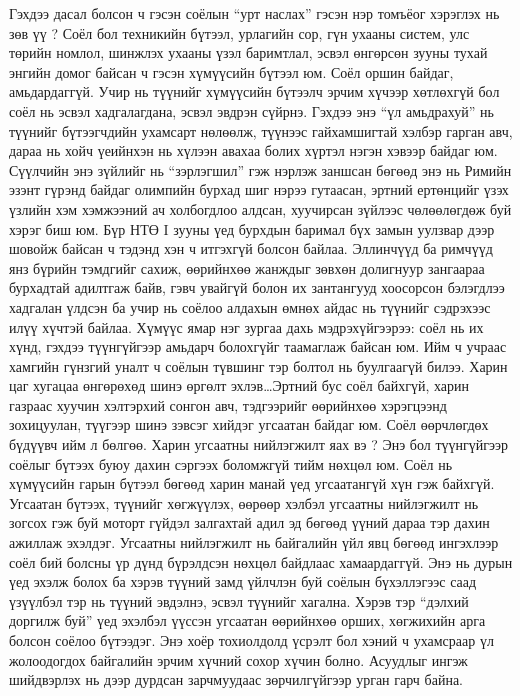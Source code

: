 Гэхдээ дасал болсон ч гэсэн соёлын “урт наслах” гэсэн нэр томъёог хэрэглэх нь зөв үү ? Соёл бол техникийн бүтээл, урлагийн сор, гүн ухааны систем, улс төрийн номлол, шинжлэх ухааны үзэл баримтлал, эсвэл өнгөрсөн зууны тухай энгийн домог байсан ч гэсэн хүмүүсийн бүтээл юм. Соёл оршин байдаг, амьдардаггүй. Учир нь түүнийг хүмүүсийн бүтээлч эрчим хүчээр хөтлөхгүй бол соёл нь эсвэл хадгалагдана, эсвэл эвдрэн сүйрнэ. Гэхдээ энэ “үл амьдрахуй” нь түүнийг бүтээгчдийн ухамсарт нөлөөлж, түүнээс гайхамшигтай хэлбэр гарган авч, дараа нь хойч үеийнхэн нь хүлээн авахаа болих хүртэл нэгэн хэвээр байдаг юм. Сүүлчийн энэ зүйлийг нь “зэрлэгшил” гэж нэрлэж заншсан бөгөөд энэ нь Римийн эзэнт гүрэнд байдаг олимпийн бурхад шиг нэрээ гутаасан, эртний ертөнцийг үзэх үзлийн хэм хэмжээний ач холбогдлоо алдсан, хуучирсан зүйлээс чөлөөлөгдөж буй хэрэг биш юм. Бүр НТӨ I зууны үед бурхдын баримал бүх замын уулзвар дээр шовойж байсан ч тэдэнд хэн ч итгэхгүй болсон байлаа. Эллинчүүд ба римчүүд янз бүрийн тэмдгийг сахиж, өөрийнхөө жанждыг зөвхөн долигнуур зангаараа бурхадтай адилтгаж байв, гэвч увайгүй болон их зантангууд хоосорсон бэлэгдлээ хадгалан үлдсэн ба учир нь соёлоо алдахын өмнөх айдас нь түүнийг сэдрэхээс илүү хүчтэй байлаа. Хүмүүс ямар нэг зургаа дахь мэдрэхүйгээрээ: соёл нь их хүнд, гэхдээ түүнгүйгээр амьдарч болохгүйг таамаглаж байсан юм. Ийм ч учраас хамгийн гүнзгий уналт ч соёлын түвшинг тэр болтол нь буулгаагүй билээ. Харин цаг хугацаа өнгөрөхөд шинэ өргөлт эхлэв…Эртний бус соёл байхгүй, харин газраас хуучин хэлтэрхий сонгон авч, тэдгээрийг өөрийнхөө хэрэгцээнд зохицуулан, түүгээр шинэ зэвсэг хийдэг угсаатан байдаг юм. Соёл өөрчлөгдөх бүдүүвч ийм л бөлгөө.
Харин угсаатны нийлэгжилт яах вэ ? Энэ бол түүнгүйгээр соёлыг бүтээх буюу дахин сэргээх боломжгүй тийм нөхцөл юм. Соёл нь хүмүүсийн гарын бүтээл бөгөөд харин манай үед угсаатангүй хүн гэж байхгүй. Угсаатан бүтээх, түүнийг хөгжүүлэх, өөрөөр хэлбэл угсаатны нийлэгжилт нь зогсох гэж буй моторт гүйдэл залгахтай адил эд бөгөөд үүний дараа тэр дахин ажиллаж эхэлдэг.
Угсаатны нийлэгжилт нь байгалийн үйл явц бөгөөд ингэхлээр соёл бий болсны үр дүнд бүрэлдсэн нөхцөл байдлаас хамаардаггүй. Энэ нь дурын үед эхэлж болох ба хэрэв түүний замд үйлчлэн буй соёлын бүхэллэгээс саад үзүүлбэл тэр нь түүний эвдэлнэ, эсвэл түүнийг хагална. Хэрэв тэр “дэлхий доргилж буй” үед эхэлбэл үүссэн угсаатан өөрийнхөө орших, хөгжихийн арга болсон соёлоо бүтээдэг. Энэ хоёр тохиолдолд үсрэлт бол хэний ч ухамсраар үл жолоодогдох байгалийн эрчим хүчний сохор хүчин болно. Асуудлыг ингэж шийдвэрлэх нь дээр дурдсан зарчмуудаас зөрчилгүйгээр урган гарч байна.
